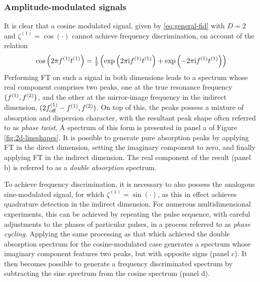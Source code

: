 \subsubsection{Amplitude-modulated signals}
It is clear that a cosine modulated signal, given by \eqref{eq:general-fid}
with $D=2$ and $\zeta^{(1)} = \cos(\cdot)$ cannot achieve frequency
discrimination, on account of the relation
\begin{equation}
    \cos\left(2 \pi f^{(1)} t^{(1)}\right) =
    \tfrac{1}{2} \left(\exp\left(2 \pi \mathrm{i} f^{(1)} t^{(1)} \right) + \exp\left(-2 \pi \mathrm{i}
    f^{(1)} t^{(1)} \right)\right)
\end{equation}
Performing \ac{FT} on such a signal in both dimensions leads to a spectrum
whose real component comprises two peaks, one at the true resonance frequency
$\left(f^{(1)}, f^{(2)}\right)$, and the other at the mirror-image frequency in the
indirect dimension, $(2f_{\mathrm{off}}^{(1)} - f^{(1)}, f^{(2)})$. On top of this, the
peaks possess a mixture of absorption and dispersion character, with the
resultant peak shape often referred to as \emph{phase twist}\cite{Keeler1985}.
A spectrum of this form is presented in panel a of Figure \ref{fig:2d-lineshapes}.
It is possible to generate pure absorption peaks by applying \ac{FT} in the
direct dimension, setting the imaginary component to zero, and finally
applying \ac{FT} in the indirect dimension. The real component of the result
(panel b) is referred to as a \emph{double absorption} spectrum.

To achieve frequency discrimination, it is necessary to also possess the
analogous sine-modulated signal, for which $\zeta^{(1)} = \sin(\cdot)$, as this
in effect achieves quadrature detection in the indirect dimension. For
numerous multidimensional experiments, this can be achieved by repeating the
pulse sequence, with careful adjustments to the phases of particular pulses, in
a process referred to as \emph{phase cycling}\cite[Chapter 11]{Keeler2010}.
Applying the same processing as that which achieved the double absorption
spectrum for the cosine-modulated case generates a spectrum whose imaginary
component features two peaks, but with opposite signs (panel c).
It then becomes possible to generate a frequency discriminated spectrum by
subtracting the sine spectrum from the cosine spectrum (panel d).

